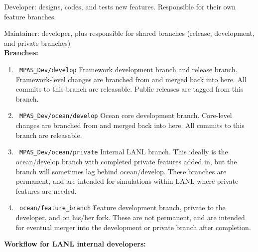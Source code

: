 \documentclass[11pt]{article}
\begin{document}
Developer: designs, codes, and tests new features.  Responsible for their own feature branches.

Maintainer: developer, plus responsible for shared branches (release, development, and private branches)\\

{\bf Branches:}
\begin{enumerate}
\item \verb| MPAS_Dev/develop|  Framework development branch and release branch.  Framework-level changes are branched from and merged back into here.   All commits to this branch are releasable.  Public releases are tagged from this branch.

\item \verb| MPAS_Dev/ocean/develop|  Ocean core development branch.  Core-level changes are branched from and merged back into here.  All commits to this branch are releasable.

\item \verb| MPAS_Dev/ocean/private|  Internal LANL branch.  This ideally is the ocean/develop branch with completed private features added in, but the branch will sometimes lag behind ocean/develop.  These branches are permanent, and are intended for simulations within LANL where private features are needed.

\item \verb| ocean/feature_branch|  Feature development branch, private to the developer, and on his/her fork.  These are not permanent, and are intended for eventual merger into the development or private branch after completion.
\end{enumerate}

{\bf Workflow for LANL internal developers:}
\end{document}
